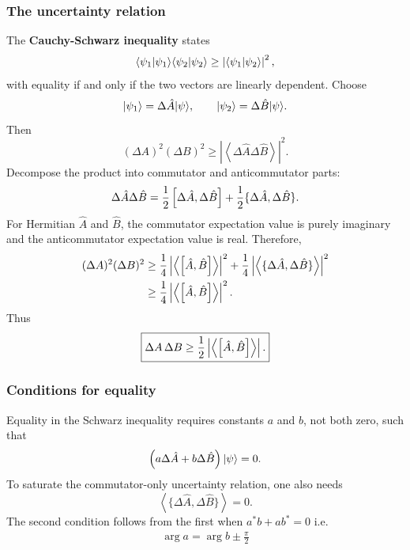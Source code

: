 \subsubsection{The uncertainty relation}
The \textbf{Cauchy-Schwarz inequality} states
\begin{equation}
 \langle{\psi_1|\psi_1}\rangle\langle{\psi_2|\psi_2}\rangle
 \geq\left|\langle{\psi_1|\psi_2}\rangle\right|^2,
\end{equation}
with equality if and only if the two vectors are linearly dependent.
Choose
\begin{equation}
 |{\psi_1}\rangle=\Delta\hat A|{\psi}\rangle,
 \qquad
 |{\psi_2}\rangle=\Delta\hat B|{\psi}\rangle.
\end{equation}
Then
\begin{equation}
 (\Delta A)^2(\Delta B)^2
 \geq\left|\left\langle\Delta\hat A\Delta\hat B\right\rangle\right|^2.
\end{equation}
Decompose the product into commutator and anticommutator parts:
\begin{equation}
 \Delta\hat A\Delta\hat B
 =\frac12\left[\Delta\hat A,\Delta\hat B\right]
 +\frac12\{\Delta\hat A,\Delta\hat B\}.
\end{equation}
For Hermitian $\hat A$ and $\hat B$, the commutator expectation value is
purely imaginary and the anticommutator expectation value is real. Therefore,
\begin{align}
 (\Delta A)^2(\Delta B)^2
 &\geq\frac14\left|\left\langle
 \left[\hat A,\hat B\right]\right\rangle\right|^2
 +\frac14\left|\left\langle
 \{\Delta\hat A,\Delta\hat B\}\right\rangle\right|^2\\
 &\geq\frac14\left|\left\langle
 \left[\hat A,\hat B\right]\right\rangle\right|^2.
\end{align}
Thus
\begin{equation}
 \boxed{\Delta A\,\Delta B
 \geq\frac12\left|\left\langle\left[\hat A,\hat B\right]\right\rangle\right|.}
\end{equation}

\subsubsection{Conditions for equality}
Equality in the Schwarz inequality requires constants $a$ and $b$, not both
zero, such that
\begin{equation}
 \left(a\Delta\hat A+b\Delta\hat B\right)|{\psi}\rangle=0.
\end{equation}
To saturate the commutator-only uncertainty relation, one also needs
\begin{equation}
 \left\langle\{\Delta\hat A,\Delta\hat B\}\right\rangle=0.
\end{equation}
The second condition follows from the first when $a^\ast b+ab^\ast=0$ i.e. 
\begin{align}
    \arg{a}=\arg{b}\pm\frac\pi2
\end{align}

